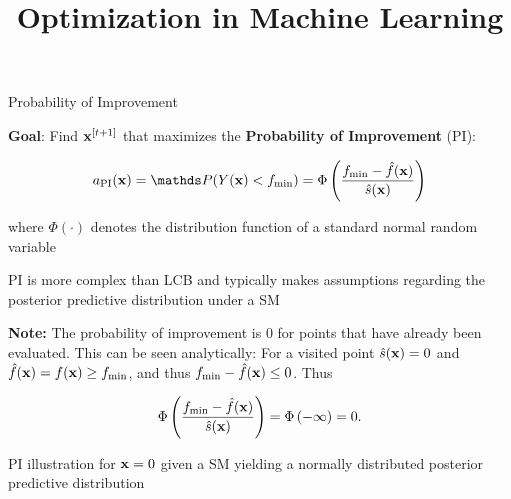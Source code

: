 \documentclass[11pt,compress,t,notes=noshow, xcolor=table]{beamer}
\title{Optimization in Machine Learning}
\date{}
\begin{document}

\begin{vbframe}{Probability of Improvement}

\textbf{Goal}: Find $\mathbf{x}^{[t+1]}$ that maximizes the \textbf{Probability of Improvement} (PI):

$$
  a_{\text{PI}}(\xv) = \P(Y(\xv) < \fmin) = \Phi\left(\frac{\fmin - \fh(\xv)}{\sh(\xv)}\right)
$$

where $\Phi(\cdot)$ denotes the distribution function of a standard normal random variable\\

\vspace{1em}

PI is more complex than LCB and typically makes assumptions regarding the posterior predictive distribution under a SM

\vfill

\begin{footnotesize}
\textbf{Note:} The probability of improvement is $0$ for points that have already been evaluated. This can be seen analytically: For a visited point $\hat{s}(\mathbf{x}) = 0$ and $\hat{f}(\mathbf{x}) = f(\mathbf{x}) \ge f_{\min}$, and thus $f_{\min} - \hat{f}(\mathbf{x}) \le 0$. Thus

$$
  \Phi\left(\frac{f_{\min} - \hat{f}(\mathbf{x})}{\hat{s}(\mathbf{x})}\right) = \Phi\left(- \infty\right) = 0.
$$

\end{footnotesize}

\framebreak

PI illustration for $\mathbf{x} = 0$ given a SM yielding a normally distributed posterior predictive distribution\\

\vspace{0.45em}


\end{vbframe}
\end{document}
